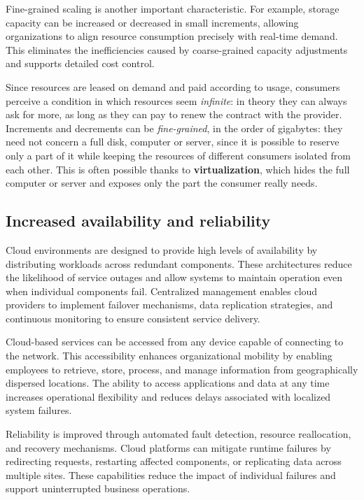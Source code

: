 Fine-grained scaling is another important characteristic. For example, storage capacity can be increased or decreased in small increments, allowing organizations to align resource consumption precisely with real-time demand. This eliminates the inefficiencies caused by coarse-grained capacity adjustments and supports detailed cost control.

Since resources are leased on demand and paid according to usage, consumers perceive a condition in which resources seem \emph{infinite}: in theory they can always ask for more, as long as they can pay to renew the contract with the provider. Increments and decrements can be \emph{fine-grained}, in the order of gigabytes: they need not concern a full disk, computer or server, since it is possible to reserve only a part of it while keeping the resources of different consumers isolated from each other. This is often possible thanks to \textbf{virtualization}, which hides the full computer or server and exposes only the part the consumer really needs.

\subsection{Increased availability and reliability}

Cloud environments are designed to provide high levels of availability by distributing workloads across redundant components. These architectures reduce the likelihood of service outages and allow systems to maintain operation even when individual components fail. Centralized management enables cloud providers to implement failover mechanisms, data replication strategies, and continuous monitoring to ensure consistent service delivery.

Cloud-based services can be accessed from any device capable of connecting to the network. This accessibility enhances organizational mobility by enabling employees to retrieve, store, process, and manage information from geographically dispersed locations. The ability to access applications and data at any time increases operational flexibility and reduces delays associated with localized system failures.

\begin{center}
\end{center}

Reliability is improved through automated fault detection, resource reallocation, and recovery mechanisms. Cloud platforms can mitigate runtime failures by redirecting requests, restarting affected components, or replicating data across multiple sites. These capabilities reduce the impact of individual failures and support uninterrupted business operations.

